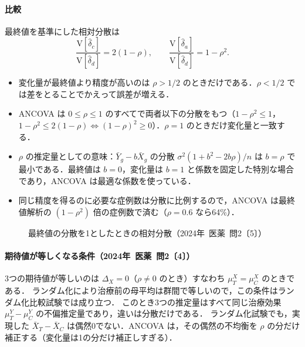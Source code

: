 \documentclass[a4paper,11pt,openany]{ltjsbook}
\newcommand{\kakomon}[2]{\mbox{#1年 医薬 問#2}}
\newcommand{\V}{\mathrm{V}}
\begin{document}
\paragraph{比較}
最終値を基準にした相対分散は
\[
\frac{\V[\hat\delta_c]}{\V[\hat\delta_d]}=2(1-\rho),\qquad \frac{\V[\hat\delta_a]}{\V[\hat\delta_d]}=1-\rho^2 .
\]
\begin{itemize}
\item 変化量が最終値より精度が高いのは $\rho>1/2$ のときだけである．$\rho<1/2$ では差をとることでかえって誤差が増える．
\item ANCOVA は $0\le\rho\le1$ のすべてで両者以下の分散をもつ（$1-\rho^2\le1$，$1-\rho^2\le2(1-\rho)\iff(1-\rho)^2\ge0$）．$\rho=1$ のときだけ変化量と一致する．
\item $\rho$ の推定量としての意味：$\bar Y_g-b\bar X_g$ の分散 $\sigma^2(1+b^2-2b\rho)/n$ は $b=\rho$ で最小である．最終値は $b=0$，変化量は $b=1$ と係数を固定した特別な場合であり，ANCOVA は最適な係数を使っている．
\item 同じ精度を得るのに必要な症例数は分散に比例するので，ANCOVA は最終値解析の $(1-\rho^2)$ 倍の症例数で済む（$\rho=0.6$ なら64\%）．
\end{itemize}
\begin{figure}[htbp]
\centering
{}
\caption{最終値の分散を1としたときの相対分散（\kakomon{2024}{2}〔5〕）}\label{fig:08-ancova}
\end{figure}

\paragraph{期待値が等しくなる条件（\kakomon{2024}{2}〔4〕）}
3つの期待値が等しいのは $\Delta_X=0$（$\rho\ne0$ のとき）すなわち $\mu_T^X=\mu_C^X$ のときである．
ランダム化により治療前の母平均は群間で等しいので，この条件はランダム化比較試験では成り立つ．
このとき3つの推定量はすべて同じ治療効果 $\mu_T^Y-\mu_C^Y$ の不偏推定量であり，違いは分散だけである．
ランダム化試験でも，実現した $\bar X_T-\bar X_C$ は偶然0でない．ANCOVA は，その偶然の不均衡を $\rho$ の分だけ補正する（変化量は1の分だけ補正しすぎる）．
\end{document}
